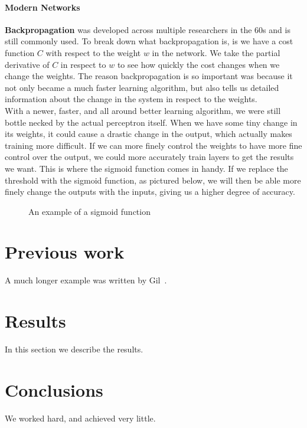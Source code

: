 \documentclass[12pt]{article}
\begin{document}
\paragraph{Modern Networks}
\textbf{Backpropagation} was developed across multiple researchers in the 60s and is still commonly used. To break down what backpropagation is, is we have a cost function $C$ with respect to the weight $w$ in the network. We take the partial derivative of $C$ in respect to $w$ to see how quickly the cost changes when we change the weights. The reason backpropagation is so important was because it not only became a much faster learning algorithm, but also tells us detailed information about the change in the system in respect to the weights.  \\

With a newer, faster, and all around better learning algorithm, we were still bottle necked by the actual perceptron itself. When we have some tiny change in its weights, it could cause a drastic change in the output, which actually makes training more difficult. If we can more finely control the weights to have more fine control over the output, we could more accurately train layers to get the results we want. This is where the sigmoid function comes in handy. If we replace the threshold with the sigmoid function, as pictured below, we will then be able more finely change the outputs with the inputs, giving us a higher degree of accuracy. 

\begin{figure}[H]
    \centering
    \def\svgwidth{\columnwidth}
    
    \caption{An example of a sigmoid function}
\end{figure}

\section{Previous work}\label{previous work}
A much longer \LaTeXe{} example was written by Gil~\cite{Gil:02}.

\section{Results}\label{results}
In this section we describe the results.

\section{Conclusions}\label{conclusions}
We worked hard, and achieved very little.




\end{document}
